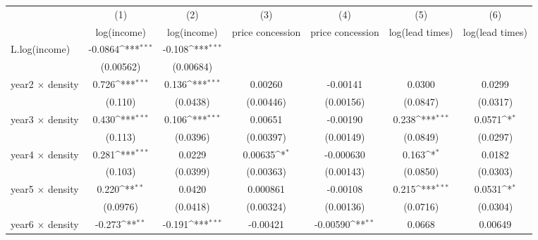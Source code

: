 {
\def\sym#1{\ifmmode^{#1}\else\(^{#1}\)\fi}
\begin{tabular}{l*{6}{c}}
\toprule
            &\multicolumn{1}{c}{(1)}&\multicolumn{1}{c}{(2)}&\multicolumn{1}{c}{(3)}&\multicolumn{1}{c}{(4)}&\multicolumn{1}{c}{(5)}&\multicolumn{1}{c}{(6)}\\
            &\multicolumn{1}{c}{log(income)}&\multicolumn{1}{c}{log(income)}&\multicolumn{1}{c}{price concession}&\multicolumn{1}{c}{price concession}&\multicolumn{1}{c}{log(lead times)}&\multicolumn{1}{c}{log(lead times)}\\
\midrule
L.log(income) &     -0.0864\sym{***}&      -0.108\sym{***}&                     &                     &                     &                     \\
            &   (0.00562)         &   (0.00684)         &                     &                     &                     &                     \\
\addlinespace
year2 $\times$ density&       0.726\sym{***}&       0.136\sym{***}&     0.00260         &    -0.00141         &      0.0300         &      0.0299         \\
            &     (0.110)         &    (0.0438)         &   (0.00446)         &   (0.00156)         &    (0.0847)         &    (0.0317)         \\
\addlinespace
year3 $\times$ density&       0.430\sym{***}&       0.106\sym{***}&     0.00651         &    -0.00190         &       0.238\sym{***}&      0.0571\sym{*}  \\
            &     (0.113)         &    (0.0396)         &   (0.00397)         &   (0.00149)         &    (0.0849)         &    (0.0297)         \\
\addlinespace
year4 $\times$ density&       0.281\sym{***}&      0.0229         &     0.00635\sym{*}  &   -0.000630         &       0.163\sym{*}  &      0.0182         \\
            &     (0.103)         &    (0.0399)         &   (0.00363)         &   (0.00143)         &    (0.0850)         &    (0.0303)         \\
\addlinespace
year5 $\times$ density&       0.220\sym{**} &      0.0420         &    0.000861         &    -0.00108         &       0.215\sym{***}&      0.0531\sym{*}  \\
            &    (0.0976)         &    (0.0418)         &   (0.00324)         &   (0.00136)         &    (0.0716)         &    (0.0304)         \\
\addlinespace
year6 $\times$ density&      -0.273\sym{**} &      -0.191\sym{***}&    -0.00421         &    -0.00590\sym{**} &      0.0668         &     0.00649         \\

\end{tabular}}
